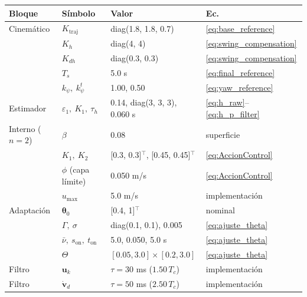 \begin{tabular}{llll}
\toprule
Bloque & S\'imbolo & Valor & Ec. \\
\midrule
Cinem\'atico & $K_{\mathrm{traj}}$ & diag(1.8, 1.8, 0.7) & \eqref{eq:base_reference} \\
 & $K_h$ & diag(4, 4) & \eqref{eq:swing_compensation} \\
 & $K_{dh}$ & diag(0.3, 0.3) & \eqref{eq:swing_compensation} \\
 & $T_s$ & 5.0 s & \eqref{eq:final_reference} \\
 & $k_\psi,\ k_\psi^t$ & 1.00, 0.50 & \eqref{eq:yaw_reference} \\
Estimador & $\varepsilon_1,\ K_1,\ \tau_h$ & 0.14, diag(3, 3, 3), 0.060 s & \eqref{eq:h_raw}--\eqref{eq:h_p_filter} \\
Interno ($n=2$) & $\beta$ & 0.08 & superficie \\
 & $K_1,\ K_2$ & [0.3, 0.3]$^\top$, [0.45, 0.45]$^\top$ & \eqref{eq:AccionControl} \\
 & $\phi$ (capa l\'imite) & 0.050 m/s & \eqref{eq:AccionControl} \\
 & $u_{\max}$ & 5.0 m/s & implementaci\'on \\
Adaptaci\'on & $\boldsymbol{\theta}_0$ & [0.4, 1]$^\top$ & nominal \\
 & $\Gamma,\ \sigma$ & diag(0.1, 0.1), 0.005 & \eqref{eq:ajuste_theta} \\
 & $\bar\nu,\ s_{\mathrm{on}},\ t_{\mathrm{on}}$ & 5.0, 0.050, 5.0 s & \eqref{eq:ajuste_theta} \\
 & $\Theta$ & $[0.05,3.0]\times[0.2,3.0]$ & \eqref{eq:ajuste_theta} \\
Filtro & $\mathbf{u}_k$ & $\tau = 30$ ms ($1.50\,T_c$) & implementaci\'on \\
Filtro & $\dot{\mathbf{v}}_d$ & $\tau = 50$ ms ($2.50\,T_c$) & implementaci\'on \\
\bottomrule
\end{tabular}
